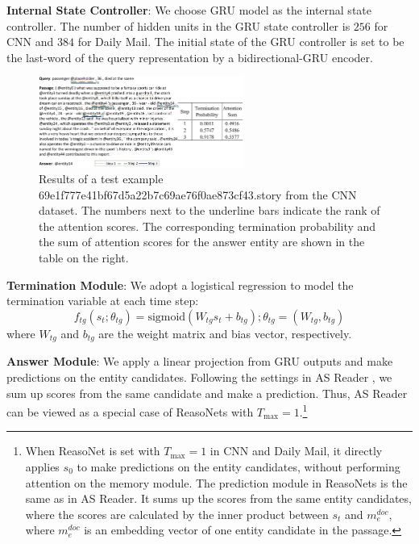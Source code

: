 \documentclass[sigconf]{acmart}
\begin{document}
\textbf{Internal State Controller}: We choose GRU model as the internal state controller. The number of hidden units in the GRU state controller is $256$ for CNN and $384$ for Daily Mail. The initial state of the GRU controller is set to be the last-word of the query representation by a bidirectional-GRU encoder. 


\begin{figure}[th!]  %
	\centering
	\includegraphics[width=0.6\textwidth]{figure/cnn_visualization_w_table}
	\caption{{Results of a test example 69e1f777e41bf67d5a22b7c69ae76f0ae873cf43.story from the CNN dataset. The numbers next to the underline bars indicate the rank of the attention scores. The corresponding termination probability and the sum of attention scores for the answer entity are shown in the table on the right.}}
	\label{fig:cnn_visualization}
\end{figure}

\textbf{Termination Module}: We adopt a logistical regression to model the termination variable at each time step: 
\[f_{tg}(s_t; \theta_{tg}) = \text{sigmoid}({W_{tg}} s_t + {b_{tg}}); \theta_{tg} = ({W_{tg}}, {b_{tg}})\]
where $W_{tg}$ and $b_{tg}$ are the weight matrix and bias vector, respectively.

\textbf{Answer Module}: We apply a linear projection from GRU outputs and make predictions on the entity candidates. Following the settings in AS Reader \citep{KadlecAttentionSum2016}, we sum up scores from the same candidate and make a prediction. Thus, AS Reader can be viewed as a special case of ReasoNets with $T_{\text{max}} = 1$.\footnote{When ReasoNet is set with $T_{\text{max}} = 1$ in CNN and Daily Mail, it directly applies $s_0$ to make predictions on the entity candidates, without performing attention on the memory module. The prediction module in ReasoNets is the same as in AS Reader. It sums up the scores from the same entity candidates, where the scores are calculated by the inner product between $s_t$ and $m^{doc}_{e}$, where $m^{doc}_{e}$ is an embedding vector of one entity candidate in the passage.}
\end{document}
